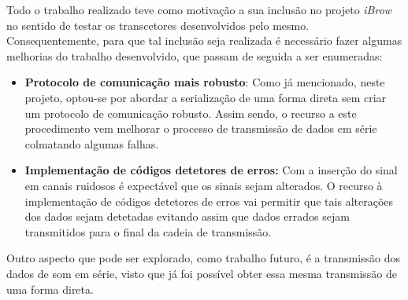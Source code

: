 Todo o trabalho realizado teve como motivação a sua inclusão no projeto \textit{iBrow} no sentido de testar os transcetores desenvolvidos pelo mesmo. Consequentemente, para que tal inclusão seja realizada é necessário fazer algumas melhorias do trabalho desenvolvido, que passam de seguida a ser enumeradas:
\begin{itemize}
	\item \textbf{Protocolo de comunicação mais robusto}: Como já mencionado, neste projeto, optou-se por abordar a serialização de uma forma direta sem criar um protocolo de comunicação robusto. Assim sendo, o recurso a este procedimento vem melhorar o processo de transmissão de dados em série colmatando algumas falhas.
	
	\item \textbf{Implementação de códigos detetores de erros:} Com a inserção do sinal em canais ruidosos é expectável que os sinais sejam alterados. O recurso à implementação de códigos detetores de erros vai permitir que tais alterações dos dados sejam detetadas evitando assim que dados errados sejam transmitidos para o final da cadeia de transmissão.
\end{itemize}

Outro aspecto que pode ser explorado, como trabalho futuro, é a transmissão dos dados de som em série, visto que já foi possível obter essa mesma transmissão de uma forma direta. 


%
%
%

